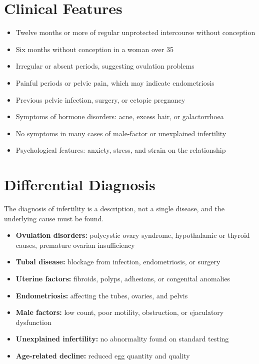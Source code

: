 \section*{Clinical Features}
\begin{itemize}
    \item Twelve months or more of regular unprotected intercourse without conception
    \item Six months without conception in a woman over 35
    \item Irregular or absent periods, suggesting ovulation problems
    \item Painful periods or pelvic pain, which may indicate endometriosis
    \item Previous pelvic infection, surgery, or ectopic pregnancy
    \item Symptoms of hormone disorders: acne, excess hair, or galactorrhoea
    \item No symptoms in many cases of male-factor or unexplained infertility
    \item Psychological features: anxiety, stress, and strain on the relationship
\end{itemize}

\section*{Differential Diagnosis}
The diagnosis of infertility is a description, not a single disease, and the underlying cause must be found.
\begin{itemize}
    \item \textbf{Ovulation disorders:} polycystic ovary syndrome, hypothalamic or thyroid causes, premature ovarian insufficiency
    \item \textbf{Tubal disease:} blockage from infection, endometriosis, or surgery
    \item \textbf{Uterine factors:} fibroids, polyps, adhesions, or congenital anomalies
    \item \textbf{Endometriosis:} affecting the tubes, ovaries, and pelvis
    \item \textbf{Male factors:} low count, poor motility, obstruction, or ejaculatory dysfunction
    \item \textbf{Unexplained infertility:} no abnormality found on standard testing
    \item \textbf{Age-related decline:} reduced egg quantity and quality
\end{itemize}


